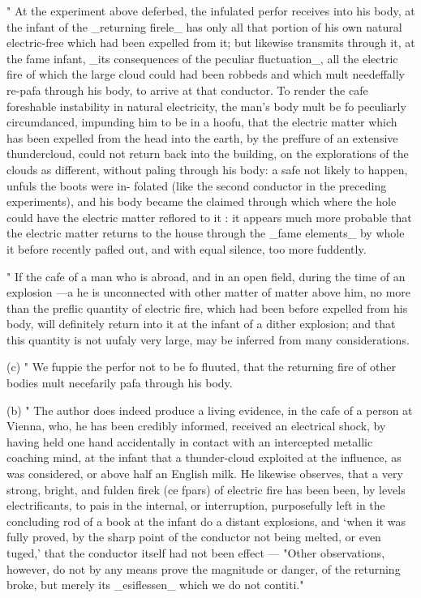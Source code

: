 " At the experiment above deferbed, the infulated perfor receives into his body, at the infant of the \_returning firele\_ has only all that portion of his own natural electric-free which had been expelled from it; but likewise transmits through it, at the fame infant, \_its consequences of the peculiar fluctuation\_, all the electric fire of which the large cloud could had been robbeds and which mult needeffally re-pafa through his body, to arrive at that conductor. To render the cafe foreshable instability in natural electricity, the man's body mult be fo peculiarly circumdanced, impunding him to be in a hoofu, that the electric matter which has been expelled from the head into the earth, by the preffure of an extensive thundercloud, could not return back into the building, on the explorations of the clouds as different, without paling through his body: a safe not likely to happen, unfuls the boots were in- folated (like the second conductor in the preceding experiments), and his body became the claimed through which where the hole could have the electric matter reflored to it : it appears much more probable that the electric matter returns to the house through the \_fame elements\_ by whole it before recently pafled out, and with equal silence, too more fuddently.\par\medskip
" If the cafe of a man who is abroad, and in an open field, during the time of an explosion —a he is unconnected with other matter of matter above him, no more than the preflic quantity of electric fire, which had been before expelled from his body, will definitely return into it at the infant of a dither explosion; and that this quantity is not uufaly very large, may be inferred from many considerations.\par\medskip
(c) " We fuppie the perfor not to be fo fluuted, that the returning fire of other bodies mult necefarily pafa through his body.\par\medskip
(b) " The author does indeed produce a living evidence, in the cafe of a person at Vienna, who, he has been credibly informed, received an electrical shock, by having held one hand accidentally in contact with an intercepted metallic coaching mind, at the infant that a thunder-cloud exploited at the influence, as was considered, or above half an English milk. He likewise observes, that a very strong, bright, and fulden firek (ce fpars) of electric fire has been been, by levels electrificants, to pais in the internal, or interruption, purposefully left in the concluding rod of a book at the infant do a distant explosions, and ‘when it was fully proved, by the sharp point of the conductor not being melted, or even tuged,' that the conductor itself had not been effect — "Other observations, however, do not by any means prove the magnitude or danger, of the returning broke, but merely its \_esiflessen\_ which we do not contiti."\par\medskip
